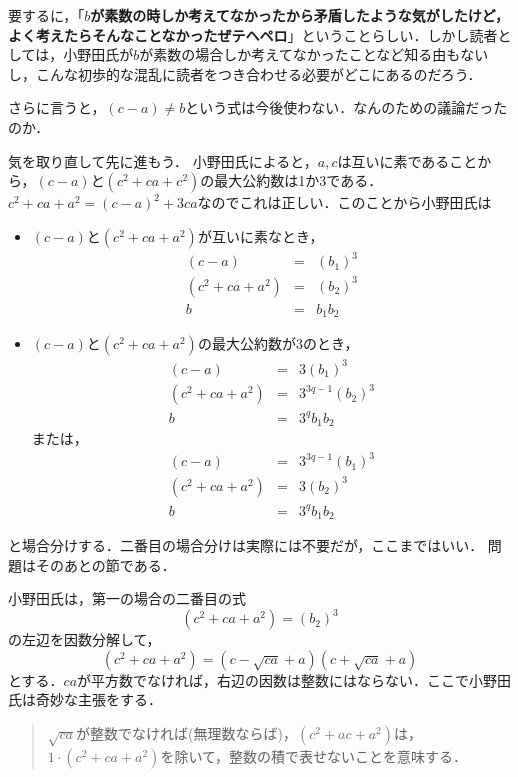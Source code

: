 要するに，「\textbf{$b$が素数の時しか考えてなかったから矛盾したような気がしたけど，よく考えたらそんなことなかったぜテヘペロ}」ということらしい．しかし読者としては，小野田氏が$b$が素数の場合しか考えてなかったことなど知る由もないし，こんな初歩的な混乱に読者をつき合わせる必要がどこにあるのだろう．

さらに言うと，$(c-a)\neq b$という式は今後使わない．なんのための議論だったのか．



気を取り直して先に進もう．
小野田氏によると，$a,c$は互いに素であることから，$(c-a)$と$(c^2+ca+c^2)$の最大公約数は1か3である．$c^2+ca+a^2=(c-a)^2+3ca$なのでこれは正しい．このことから小野田氏は

\begin{itemize}
\item $(c-a)$と$(c^2+ca+a^2)$が互いに素なとき，
\begin{eqnarray*}
(c-a)&=&(b_1)^3\\
(c^2+ca+a^2)&=&(b_2)^3\\
b&=&b_1b_2
\end{eqnarray*}

\item $(c-a)$と$(c^2+ca+a^2)$の最大公約数が3のとき，
\begin{eqnarray*}
(c-a)&=&3(b_1)^3\\
(c^2+ca+a^2)&=&3^{3q-1}(b_2)^3\\
b&=&3^qb_1b_2
\end{eqnarray*}
または，
\begin{eqnarray*}
(c-a)&=&3^{3q-1}(b_1)^3\\
(c^2+ca+a^2)&=&3(b_2)^3\\
b&=&3^qb_1b_2
\end{eqnarray*}
\end{itemize}

と場合分けする．二番目の場合分けは実際には不要だが，ここまではいい．
問題はそのあとの節である．

小野田氏は，第一の場合の二番目の式
\[(c^2+ca+a^2)=(b_2)^3\]
の左辺を因数分解して，
\[(c^2+ca+a^2)=(c-\sqrt{ca}+a)(c+\sqrt{ca}+a)\]
とする．$ca$が平方数でなければ，右辺の因数は整数にはならない．ここで小野田氏は奇妙な主張をする．

\begin{quote}
$\sqrt{ca}$が整数でなければ(無理数ならば)，$(c^2+ac+a^2)$は，$1\cdot (c^2+ca+a^2)$を除いて，整数の積で表せないことを意味する．
\end{quote}

